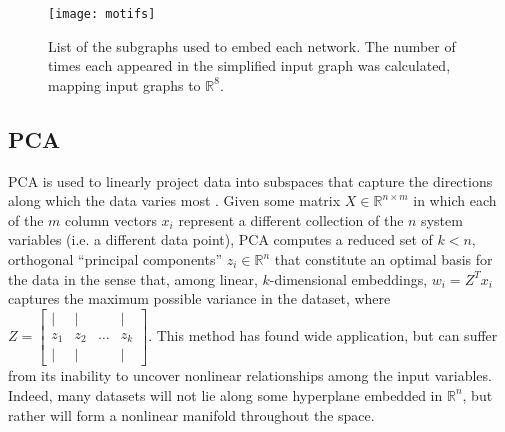 \documentclass[epjST, final]{svjour}
\begin{document}
\begin{onehalfspace}
\begin{figure}[h!]
  \vspace{-5mm}
  \centering
  \texttt{[image: motifs]}
  \caption{List of the subgraphs used to embed each network. The
    number of times each appeared in the simplified input graph was
    calculated, mapping input graphs to $\mathbb{R}^8$. \label{fig:motifs}}
\end{figure}

\subsection{PCA}
\label{sec:pca}

PCA is used to linearly project data into subspaces that capture the
directions along which the data varies most
\cite{jolliffe_principal_2014}. Given some matrix
$X \in \mathbb{R}^{n \times m}$ in which each of the $m$ column
vectors $x_i$ represent a different collection of the $n$ system
variables (i.e. a different data point), PCA computes a reduced set of
$k<n$, orthogonal ``principal components'' $z_i \in \mathbb{R}^n$ that
constitute an optimal basis for the data in the sense that, among
linear, $k$-dimensional embeddings, $w_i = Z^Tx_i$ captures the
maximum possible variance in the dataset, where
$Z = \begin{bmatrix} | & | & & | \\ z_1 & z_2 & \hdots & z_k \\ | & | & &
  | \end{bmatrix}$. This method has found wide application, but can suffer from its
inability to uncover nonlinear relationships among the input
variables. Indeed, many datasets will not lie along some hyperplane
embedded in $\mathbb{R}^n$, but rather will form a nonlinear manifold
throughout the space. \\


\end{onehalfspace}
\end{document}
